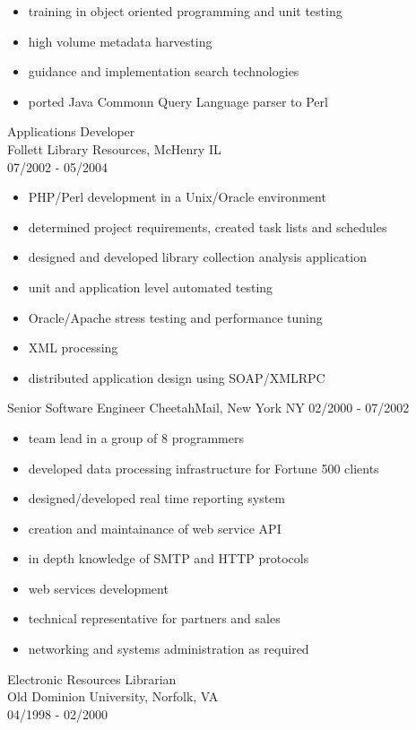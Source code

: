 \begin{itemize}
\item
  training in object oriented programming and unit testing
\item
  high volume metadata harvesting
\item
  guidance and implementation search technologies
\item
  ported Java Commonn Query Language parser to Perl
\end{itemize}
Applications Developer\\Follett Library Resources, McHenry
IL\\07/2002 - 05/2004

\begin{itemize}
\item
  PHP/Perl development in a Unix/Oracle environment
\item
  determined project requirements, created task lists and schedules
\item
  designed and developed library collection analysis application
\item
  unit and application level automated testing
\item
  Oracle/Apache stress testing and performance tuning
\item
  XML processing
\item
  distributed application design using SOAP/XMLRPC
\end{itemize}
Senior Software Engineer CheetahMail, New York NY 02/2000 -
07/2002

\begin{itemize}
\item
  team lead in a group of 8 programmers
\item
  developed data processing infrastructure for Fortune 500 clients
\item
  designed/developed real time reporting system
\item
  creation and maintainance of web service API
\item
  in depth knowledge of SMTP and HTTP protocols
\item
  web services development
\item
  technical representative for partners and sales
\item
  networking and systems administration as required
\end{itemize}
Electronic Resources Librarian\\Old Dominion University, Norfolk,
VA\\04/1998 - 02/2000

